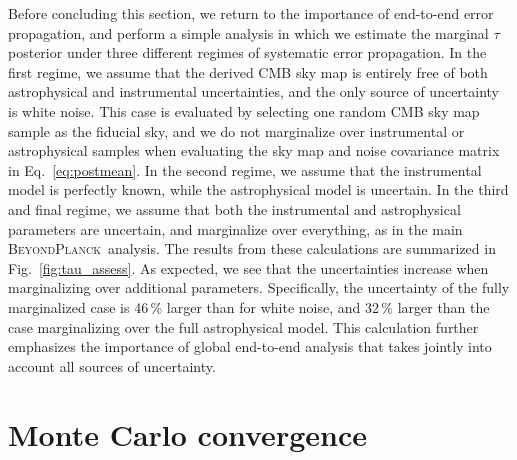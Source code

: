 \documentclass[twocolumn]{aa}
\newcommand{\BP}{\textsc{BeyondPlanck}}
\begin{document}
Before concluding this section, we return to the importance of
end-to-end error propagation, and perform a simple analysis in which
we estimate the marginal $\tau$ posterior under three different regimes
of systematic error propagation. In the first regime, we
assume that the derived CMB sky map is entirely free of both
astrophysical and instrumental uncertainties, and the only source of
uncertainty is white noise. This case is evaluated by selecting one
random CMB sky map sample as the fiducial sky, and we do not
marginalize over instrumental or astrophysical samples when evaluating
the sky map and noise covariance matrix in Eq.~\eqref{eq:postmean}. In the second
regime, we assume that the instrumental model is perfectly known,
while the astrophysical model is uncertain. In the third and final
regime, we assume that both the instrumental and astrophysical
parameters are uncertain, and marginalize over everything, as in the
main \BP\ analysis. The results from these calculations are summarized
in Fig.~\ref{fig:tau_assess}. As expected, we see that the
uncertainties increase when marginalizing over additional
parameters. Specifically, the uncertainty of the fully marginalized
case is 46\,\% larger than for white noise, and 32\,\% larger than the
case marginalizing over the full astrophysical model. This calculation
further emphasizes the importance of global end-to-end analysis that
takes jointly into account all sources of uncertainty. 


\section{Monte Carlo convergence}
\label{sec:convergence}
\end{document}
